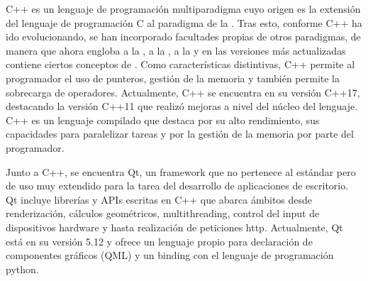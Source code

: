 C++\cite{cpp}\cite{cpp2} es un lenguaje de programación multiparadigma cuyo origen es la extensión del lenguaje de programación C al paradigma de la . Tras esto, conforme C++ ha ido evolucionando, se han incorporado facultades propias de otros paradigmas, de manera que ahora engloba a la , a la , a la  y en las versiones más actualizadas contiene ciertos conceptos de .
Como características distintivas, C++ permite al programador el uso de punteros, gestión de la memoria y también permite la sobrecarga de operadores.
Actualmente, C++ se encuentra en su versión C++17, destacando la versión C++11 que realizó mejoras a nivel del núcleo del lenguaje.
C++ es un lenguaje compilado que destaca por su alto rendimiento, sus capacidades para paralelizar tareas y por la gestión de la memoria por parte del programador.

Junto a C++, se encuentra Qt\cite{qt}, un framework que no pertenece al estándar pero de uso muy extendido para la tarea del desarrollo de aplicaciones de escritorio.
Qt incluye librerías y APIs escritas en C++ que abarca ámbitos desde renderización, cálculos geométricos, multithreading, control del input de dispositivos hardware y hasta realización de peticiones http.
Actualmente, Qt está en su versión 5.12 y ofrece un lenguaje propio para declaración de componentes gráficos (QML\cite{qml}) y un binding con el lenguaje de programación python.